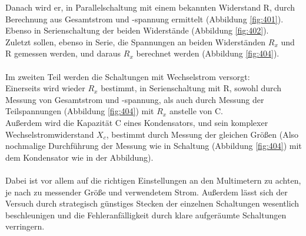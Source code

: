 \documentclass[12pt,a4paper]{article}
\begin{document}
\begin{multicols}{2}
Danach wird er, in Parallelschaltung mit einem bekannten Widerstand R, durch Berechnung aus Gesamtstrom und -spannung ermittelt (Abbildung \ref{fig:401}).\\
Ebenso in Serienschaltung der beiden Widerstände (Abbildung \ref{fig:402}).\\
Zuletzt sollen, ebenso in Serie, die Spannungen an beiden Widerständen $R_{x}$ und R gemessen werden, und daraus $R_{x}$ berechnet werden (Abbildung \ref{fig:404}).\\
\\
Im zweiten Teil werden die Schaltungen mit Wechselstrom versorgt:\\
Einerseits wird wieder $R_{x}$ bestimmt, in Serienschaltung mit R, sowohl durch Messung von Gesamtstrom und -spannung, als auch durch Messung der Teilspannungen (Abbildung \ref{fig:404}) mit $R_{x}$ anstelle von C.\\
Außerdem wird die Kapazität C eines Kondensators, und sein komplexer Wechselstromwiderstand $X_{c}$, bestimmt durch Messung der gleichen Größen (Also nochmalige Durchführung der Messung wie in Schaltung (Abbildung \ref{fig:404}) mit dem Kondensator wie in der Abbildung).\\
\\
Dabei ist vor allem auf die richtigen Einstellungen an den Multimetern zu achten, je nach zu messender Größe und verwendetem Strom. Außerdem lässt sich der Versuch durch strategisch günstiges Stecken der einzelnen Schaltungen wesentlich beschleunigen und die Fehleranfälligkeit durch klare aufgeräumte Schaltungen verringern.\\
\\
\\


\end{multicols}
\end{document}
